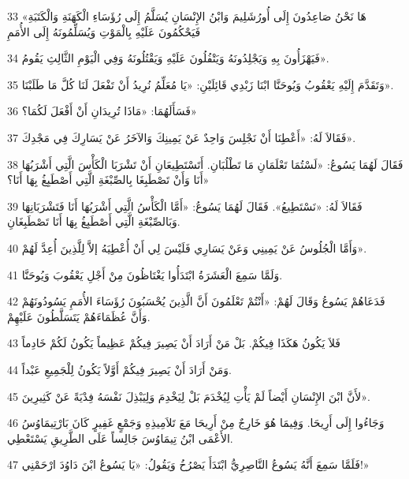 \par 33 «هَا نَحْنُ صَاعِدُونَ إِلَى أُورُشَلِيمَ وَابْنُ الإِنْسَانِ يُسَلَّمُ إِلَى رُؤَسَاءِ الْكَهَنَةِ وَالْكَتَبَةِ فَيَحْكُمُونَ عَلَيْهِ بِالْمَوْتِ وَيُسَلِّمُونَهُ إِلَى الأُمَمِ
\par 34 فَيَهْزَأُونَ بِهِ وَيَجْلِدُونَهُ وَيَتْفُلُونَ عَلَيْهِ وَيَقْتُلُونَهُ وَفِي الْيَوْمِ الثَّالِثِ يَقُومُ».
\par 35 وَتَقَدَّمَ إِلَيْهِ يَعْقُوبُ وَيُوحَنَّا ابْنَا زَبْدِي قَائِلَيْنِ: «يَا مُعَلِّمُ نُرِيدُ أَنْ تَفْعَلَ لَنَا كُلَّ مَا طَلَبْنَا».
\par 36 فَسَأَلَهُمَا: «مَاذَا تُرِيدَانِ أَنْ أَفْعَلَ لَكُمَا؟»
\par 37 فَقَالاَ لَهُ: «أَعْطِنَا أَنْ نَجْلِسَ وَاحِدٌ عَنْ يَمِينِكَ وَالآخَرُ عَنْ يَسَارِكَ فِي مَجْدِكَ».
\par 38 فَقَالَ لَهُمَا يَسُوعُ: «لَسْتُمَا تَعْلَمَانِ مَا تَطْلُبَانِ. أَتَسْتَطِيعَانِ أَنْ تَشْرَبَا الْكَأْسَ الَّتِي أَشْرَبُهَا أَنَا وَأَنْ تَصْطَبِغَا بِالصِّبْغَةِ الَّتِي أَصْطَبِغُ بِهَا أَنَا؟»
\par 39 فَقَالاَ لَهُ: «نَسْتَطِيعُ». فَقَالَ لَهُمَا يَسُوعُ: «أَمَّا الْكَأْسُ الَّتِي أَشْرَبُهَا أَنَا فَتَشْرَبَانِهَا وَبَالصِّبْغَةِ الَّتِي أَصْطَبِغُ بِهَا أَنَا تَصْطَبِغَانِ.
\par 40 وَأَمَّا الْجُلُوسُ عَنْ يَمِينِي وَعَنْ يَسَارِي فَلَيْسَ لِي أَنْ أُعْطِيَهُ إلاَّ لِلَّذِينَ أُعِدَّ لَهُمْ».
\par 41 وَلَمَّا سَمِعَ الْعَشَرَةُ ابْتَدَأُوا يَغْتَاظُونَ مِنْ أَجْلِ يَعْقُوبَ وَيُوحَنَّا.
\par 42 فَدَعَاهُمْ يَسُوعُ وَقَالَ لَهُمْ: «أَنْتُمْ تَعْلَمُونَ أَنَّ الَّذِينَ يُحْسَبُونَ رُؤَسَاءَ الأُمَمِ يَسُودُونَهُمْ وَأَنَّ عُظَمَاءَهُمْ يَتَسَلَّطُونَ عَلَيْهِمْ.
\par 43 فَلاَ يَكُونُ هَكَذَا فِيكُمْ. بَلْ مَنْ أَرَادَ أَنْ يَصِيرَ فِيكُمْ عَظِيماً يَكُونُ لَكُمْ خَادِماً
\par 44 وَمَنْ أَرَادَ أَنْ يَصِيرَ فِيكُمْ أَوَّلاً يَكُونُ لِلْجَمِيعِ عَبْداً.
\par 45 لأَنَّ ابْنَ الإِنْسَانِ أَيْضاً لَمْ يَأْتِ لِيُخْدَمَ بَلْ لِيَخْدِمَ وَلِيَبْذِلَ نَفْسَهُ فِدْيَةً عَنْ كَثِيرِينَ».
\par 46 وَجَاءُوا إِلَى أَرِيحَا. وَفِيمَا هُوَ خَارِجٌ مِنْ أَرِيحَا مَعَ تَلاَمِيذِهِ وَجَمْعٍ غَفِيرٍ كَانَ بَارْتِيمَاوُسُ الأَعْمَى ابْنُ تِيمَاوُسَ جَالِساً عَلَى الطَّرِيقِ يَسْتَعْطِي.
\par 47 فَلَمَّا سَمِعَ أَنَّهُ يَسُوعُ النَّاصِرِيُّ ابْتَدَأَ يَصْرُخُ وَيَقُولُ: «يَا يَسُوعُ ابْنَ دَاوُدَ ارْحَمْنِي!»
